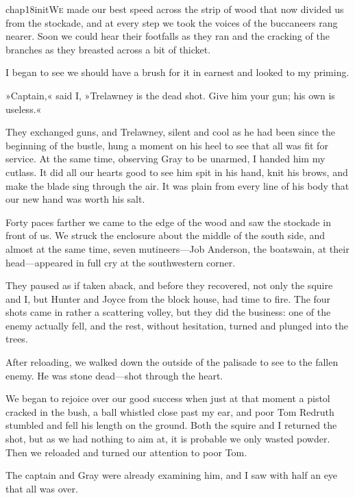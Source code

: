  
\lettrine[lines=5,image=true,findent=2pt]{chap18initW}{e} made our best speed across the strip of wood that now divided us from the stockade, and at every step we took the voices of the buccaneers rang nearer. Soon we could hear their footfalls as they ran and the cracking of the branches as they breasted across a bit of thicket.

I began to see we should have a brush for it in earnest and looked to my priming.

»Captain,« said I, »Trelawney is the dead shot. Give him your gun; his own is useless.«

They exchanged guns, and Trelawney, silent and cool as he had been since the beginning of the bustle, hung a moment on his heel to see that all was fit for service. At the same time, observing Gray to be unarmed, I handed him my cutlass. It did all our hearts good to see him spit in his hand, knit his brows, and make the blade sing through the air. It was plain from every line of his body that our new hand was worth his salt.

Forty paces farther we came to the edge of the wood and saw the stockade in front of us. We struck the enclosure about the middle of the south side, and almost at the same time, seven mutineers—Job Anderson, the boatswain, at their head—appeared in full cry at the southwestern corner.

They paused as if taken aback, and before they recovered, not only the squire and I, but Hunter and Joyce from the block house, had time to fire. The four shots came in rather a scattering volley, but they did the business: one of the enemy actually fell, and the rest, without hesitation, turned and plunged into the trees.

After reloading, we walked down the outside of the palisade to see to the fallen enemy. He was stone dead—shot through the heart.

We began to rejoice over our good success when just at that moment a pistol cracked in the bush, a ball whistled close past my ear, and poor Tom Redruth stumbled and fell his length on the ground. Both the squire and I returned the shot, but as we had nothing to aim at, it is probable we only wasted powder. Then we reloaded and turned our attention to poor Tom.

The captain and Gray were already examining him, and I saw with half an eye that all was over.

